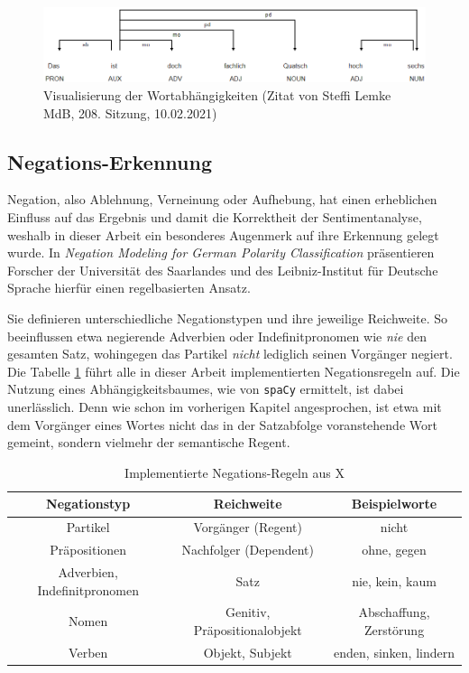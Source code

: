 \begin{figure}[htb]
\centerline{\includegraphics[width=1\textwidth]{steffi.png}}
\caption{Visualisierung der Wortabhängigkeiten (Zitat von Steffi Lemke MdB, 208. Sitzung, 10.02.2021)}
\label{steffi}
\end{figure}

\subsection{Negations-Erkennung}
\label{neg-erkennung}
Negation, also Ablehnung, Verneinung oder Aufhebung, hat einen erheblichen Einfluss auf das Ergebnis und damit die Korrektheit der Sentimentanalyse, weshalb in dieser Arbeit ein besonderes Augenmerk auf ihre Erkennung gelegt wurde. 
In \textit{Negation Modeling for German Polarity Classification} präsentieren Forscher der Universität des Saarlandes und des Leibniz-Institut für Deutsche Sprache hierfür einen regelbasierten Ansatz. 

Sie definieren unterschiedliche Negationstypen und ihre jeweilige Reichweite. 
So beeinflussen etwa negierende Adverbien oder Indefinitpronomen wie \textit{nie} den gesamten Satz, wohingegen das Partikel \textit{nicht} lediglich seinen Vorgänger negiert.  
Die Tabelle \ref{tab1} führt alle in dieser Arbeit implementierten Negationsregeln auf. 
Die Nutzung eines Abhängigkeitsbaumes, wie von \texttt{spaCy} ermittelt, ist dabei unerlässlich. 
Denn wie schon im vorherigen Kapitel angesprochen, ist etwa mit dem Vorgänger eines Wortes nicht das in der Satzabfolge voranstehende Wort gemeint, sondern vielmehr der semantische Regent. 

\begin{table}[htbp]
\caption{Implementierte Negations-Regeln aus X}
\begin{center}
\begin{tabular}{| c | c | c |}
\hline
Negationstyp & Reichweite & Beispielworte \\ \hline
Partikel & Vorgänger (Regent) & nicht \\ \hline
Präpositionen & Nachfolger (Dependent) & ohne, gegen \\ \hline
Adverbien, Indefinitpronomen & Satz & nie, kein, kaum \\ \hline
Nomen & Genitiv, Präpositionalobjekt & Abschaffung, Zerstörung \\ \hline
Verben & Objekt, Subjekt & enden, sinken, lindern \\
\hline
\end{tabular}
\label{tab1}
\end{center}
\end{table}

